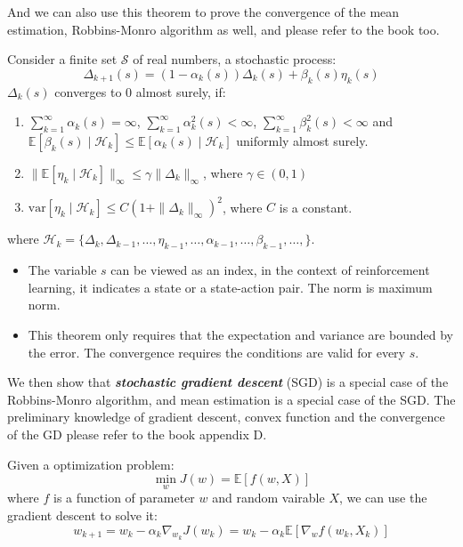 \documentclass[10pt]{elegantbook}
\newcommand{\mydefination}[1]{\textbf{\textit{\textcolor{structurecolor}{#1}}}}
\begin{document}
And we can also use this theorem to prove the convergence of the mean estimation, Robbins-Monro algorithm as well, and please refer to the book too.

\begin{theorem} \label{theorem:extension_dvoretzky}
    Consider a finite set $\mathcal S$ of real numbers, a stochastic process:
    \[ \Delta_{k+1}(s) = (1 - \alpha_k(s)) \Delta_k(s) + \beta_k(s) \eta_k(s) \]
    $\Delta_k(s)$ converges to 0 almost surely, if:
    \begin{enumerate}
        \item $\sum_{k=1}^{\infty} \alpha_k(s) = \infty$, $\sum_{k=1}^{\infty} \alpha_k^2(s) < \infty$, $\sum_{k=1}^{\infty} \beta_k^2(s) < \infty$ 
        and $\mathbb E[\beta_k(s) \mid \mathcal H_k] \leq \mathbb E[\alpha_k(s) \mid \mathcal H_k]$ uniformly almost surely.
        \item $\| \mathbb E[\eta_k \mid \mathcal H_k] \|_{\infty} \leq \gamma \| \Delta_k \|_{\infty}$, where $\gamma \in (0, 1)$
        \item $\text{var}[\eta_k \mid \mathcal H_k] \leq C (1 + \| \Delta_k \|_{\infty})^2$, where $C$ is a constant.
    \end{enumerate}
    where $\mathcal H_k = \{ \Delta_k, \Delta_{k-1}, \ldots, \eta_{k-1}, \ldots, \alpha_{k-1}, \ldots, \beta_{k-1}, \ldots, \}$.
    
    \begin{itemize}
        \item The variable $s$ can be viewed as an index, in the context of reinforcement learning, it indicates a state or a
state-action pair. The norm is maximum norm.
        \item This theorem only requires that the expectation and variance are bounded by the error. The convergence requires the conditions are valid for every $s$.
    \end{itemize}
\end{theorem}

We then show that \mydefination{stochastic gradient descent} (SGD) is a special case of the Robbins-Monro algorithm, and mean estimation is a special case 
of the SGD. The preliminary knowledge of gradient descent, convex function and the convergence of the GD please refer to the book appendix D. 

Given a optimization problem:
\[ \min_{w} J(w) = \mathbb E[f(w, X)] \]
where $f$ is a function of parameter $w$ and random vairable $X$, we can use the gradient descent to solve it:
\begin{equation}
    w_{k+1} = w_k - \alpha_k \nabla_{w_k} J(w_k) = w_k - \alpha_k \mathbb E[\nabla_{w} f(w_k, X_k)]
\end{equation}
\end{document}
